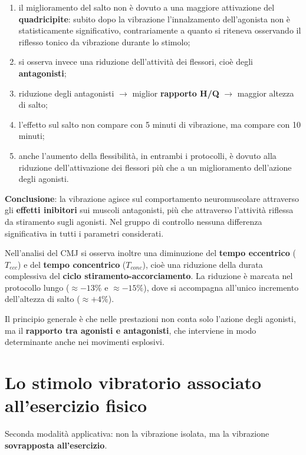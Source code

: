 \begin{enumerate}
  \item il miglioramento del salto non è dovuto a una maggiore attivazione del
    \textbf{quadricipite}: subito dopo la vibrazione l'innalzamento dell'agonista non è
    statisticamente significativo, contrariamente a quanto si riteneva osservando il riflesso tonico
    da vibrazione durante lo stimolo;
  \item si osserva invece una riduzione dell'attività dei flessori, cioè degli \textbf{antagonisti};
  \item riduzione degli antagonisti $\rightarrow$ miglior \textbf{rapporto H/Q} $\rightarrow$
    maggior altezza di salto;
  \item l'effetto sul salto non compare con 5 minuti di vibrazione, ma compare con 10 minuti;
  \item anche l'aumento della flessibilità, in entrambi i protocolli, è dovuto alla riduzione
    dell'attivazione dei flessori più che a un miglioramento dell'azione degli agonisti.
\end{enumerate}
\textbf{Conclusione}: la vibrazione agisce sul comportamento neuromuscolare attraverso gli
\textbf{effetti inibitori} sui muscoli antagonisti, più che attraverso l'attività riflessa da
stiramento sugli agonisti. Nel gruppo di controllo nessuna differenza significativa in tutti i
parametri considerati.

Nell'analisi del CMJ si osserva inoltre una diminuzione del \textbf{tempo eccentrico} ($T_{ecc}$) e
del \textbf{tempo concentrico} ($T_{conc}$), cioè una riduzione della durata complessiva del
\textbf{ciclo stiramento-accorciamento}. La riduzione è marcata nel protocollo lungo ($\approx
-13\%$ e $\approx -15\%$), dove si accompagna all'unico incremento dell'altezza di salto ($\approx
+4\%$).

Il principio generale è che nelle prestazioni non conta solo l'azione degli agonisti, ma il
\textbf{rapporto tra agonisti e antagonisti}, che interviene in modo determinante anche nei
movimenti esplosivi.

\section{Lo stimolo vibratorio associato all'esercizio fisico}

Seconda modalità applicativa: non la vibrazione isolata, ma la vibrazione \textbf{sovrapposta
all'esercizio}.

